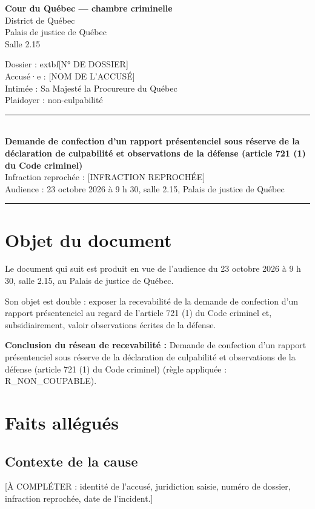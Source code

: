 \documentclass[12pt,a4paper]{article}
\begin{document}
\thispagestyle{empty}
\begin{minipage}[t]{0.60\textwidth}
\textbf{Cour du Québec — chambre criminelle}\\
District de Québec\\
Palais de justice de Québec\\
Salle 2.15
\end{minipage}\hfill
\begin{minipage}[t]{0.37\textwidth}
\raggedleft
Dossier : 	extbf{[N° DE DOSSIER]}\\
Accusé·e : [NOM DE L'ACCUSÉ]\\
Intimée : Sa Majesté la Procureure du Québec\\
Plaidoyer : non-culpabilité
\end{minipage}
\vspace{0.8cm}
\begin{center}
\rule{\textwidth}{0.4pt}\\[0.4em]
\textbf{\large Demande de confection d'un rapport présentenciel sous réserve de la déclaration de culpabilité et observations de la défense (article 721 (1) du Code criminel)}\\[0.3em]
Infraction reprochée : [INFRACTION REPROCHÉE]\\
Audience : 23 octobre 2026 à 9 h 30, salle 2.15, Palais de justice de Québec
\rule{\textwidth}{0.4pt}
\end{center}

\section{Objet du document}
Le document qui suit est produit en vue de l'audience du 23 octobre 2026 à 9 h 30, salle 2.15, au Palais de justice de Québec.

Son objet est double : exposer la recevabilité de la demande de confection d'un rapport présentenciel au regard de l'article 721 (1) du Code criminel et, subsidiairement, valoir observations écrites de la défense.

\textbf{Conclusion du réseau de recevabilité :} Demande de confection d'un rapport présentenciel sous réserve de la déclaration de culpabilité et observations de la défense (article 721 (1) du Code criminel) (règle appliquée : R\_NON\_COUPABLE).

\section{Faits allégués}
\subsection*{Contexte de la cause}
[À COMPLÉTER : identité de l'accusé, juridiction saisie, numéro de dossier,
infraction reprochée, date de l'incident.]
\end{document}
